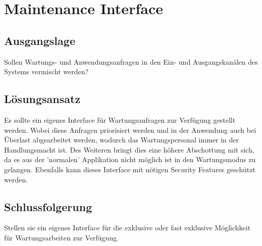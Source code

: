 
\section{Maintenance Interface}

\subsection{Ausgangslage}

Sollen Wartungs- und Anwendungsanfragen in den Ein- und Ausgangskanälen des Systems vermischt werden?

\subsection{Lösungsansatz}

Es sollte ein eigenes Interface für Wartungsanfragen zur Verfügung gestellt werden. Wobei diese Anfragen priorisiert werden und in der Anwendung auch bei Überlast abgearbeitet werden, wodurch das Wartungspersonal immer in der Handlungsmacht ist. Des Weiteren bringt dies eine höhere Abschottung mit sich, da es aus der 'normalen' Applikation nicht möglich ist in den Wartungsmodus zu gelangen. Ebenfalls kann dieses Interface mit nötigen Security Features geschützt werden.

\subsection{Schlussfolgerung}

Stellen sie ein eigenes Interface für die exklusive oder fast exklusive Möglichkeit für Wartungsarbeiten zur Verfügung.

